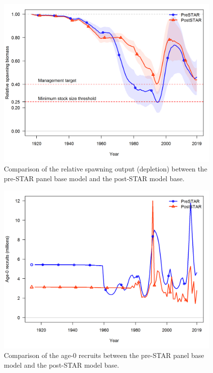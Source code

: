 \documentclass[12pt,]{article}
\begin{document}
\FloatBarrier

\begin{figure}
\centering
\includegraphics{Figures/preSTAR_postSTAR_compare_Bratio}
\caption{Comparison of the relative spawning output (depletion) between
the pre-STAR panel base model and the post-STAR model base.
\label{fig:preSTAR_postSTAR_compare_Bratio}}
\end{figure}

\begin{figure}
\centering
\includegraphics{Figures/preSTAR_postSTAR_compare_recruit}
\caption{Comparison of the age-0 recruits between the pre-STAR panel
base model and the post-STAR model base.
\label{fig:preSTAR_postSTAR_compare_recruit}}
\end{figure}
\end{document}
